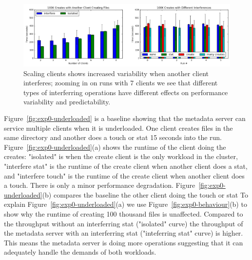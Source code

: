 \begin{figure}[tb]
\centering
\includegraphics[width=180mm]{figures/runtime-consistency-scale.png}
\caption{Scaling clients shows increased variability when another client
interferes; zooming in on runs with 7 clients we see that different types of
interferring operations have different effects on performance variability and
predictability.  }\label{fig:runtime-consistency-scale}
\end{figure}

Figure~\ref{fig:exp0-underloaded} is a baseline showing that the metadata
server can service multiple clients when it is underloaded. One client creates
files in the same directory and another does a touch or stat 15 seconds into
the run. Figure~\ref{fig:exp0-underloaded}(a) shows the runtime of the client
doing the creates: "isolated" is when the create client is the only workload in
the cluster, "interfere stat" is the runtime of the create client when another
client does a stat, and "interfere touch" is the runtime of the create client
when another client does a touch. There is only a minor performance
degradation. Figure~\ref{fig:exp0-underloaded}(b) compares the baseline
the other client doing the touch or stat
%
%
%
%
%
To explain Figure~\ref{fig:exp0-underloaded}(a) we use
Figure~\ref{fig:exp0-behaviour}(b) to show why the runtime of creating 100
thousand files is unaffected. Compared to the throughput without an
interferring stat ("isolated" curve) the throughput of the metadata server with
an interferring stat ("inteferring stat" curve) is higher. This means the
metadata server is doing more operations suggesting that it can adequately
handle the demands of both workloads.  

